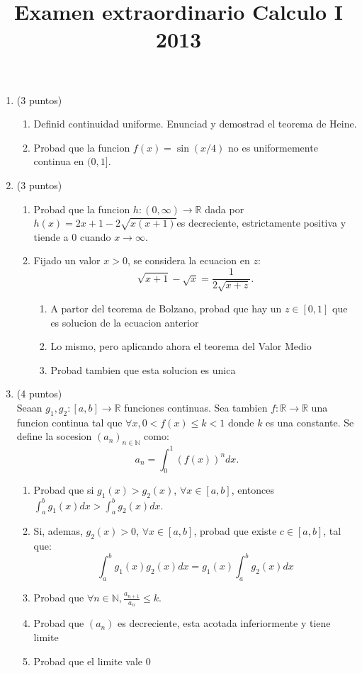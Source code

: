 \documentclass{article}
\begin{document}
\title{Examen extraordinario Calculo I 2013}
\date {}
\maketitle

\begin{enumerate}
\item (3 puntos)
\begin{enumerate}
\item Definid continuidad uniforme. Enunciad y demostrad el teorema de Heine.
\item Probad que la funcion $f(x) = \sin(x/4)$ no es uniformemente continua en $(0,1]$.
\end{enumerate}

\item (3 puntos)
\begin{enumerate}
\item Probad que la funcion $h : (0, \infty) \longrightarrow \mathbb{R}$ dada por 
$h(x) = 2x + 1 - 2\sqrt{x(x+1)}$es decreciente, estrictamente positiva y tiende a 0
cuando $x \to \infty$.
\item Fijado un valor $x > 0$, se considera la ecuacion en $z$:
\[
\sqrt{x+1} - \sqrt{x} = \frac{1}{2\sqrt{x+z}}.
\]
\begin{enumerate}
\item A partor del teorema de Bolzano, probad que hay un $z \in [0,1]$ que es solucion de la
ecuacion anterior
\item Lo mismo, pero aplicando ahora el teorema del Valor Medio
\item Probad tambien que esta solucion es unica
\end{enumerate}
\end{enumerate}
\item (4 puntos) \\
Seaan $g_1, g_2 : [a, b]  \longrightarrow \mathbb{R}$ funciones continuas. Sea tambien
$f : \mathbb{R} \longrightarrow \mathbb{R}$ una funcion continua tal que
$\forall x, 0 < f(x) \leq k < 1$ donde $k$ es una constante. Se define la socesion
$(a_n)_{n \in \mathbb{N}}$ como:
\[
a_n = \int_0^1 \left( f(x) \right)^n dx.
\]
\begin{enumerate}
\item Probad que si $g_1(x) > g_2(x)$, $\forall x \in [a, b]$, entonces
$\displaystyle \int_a^b g_1(x)dx > \int_a^b g_2(x)dx$.
\item Si, ademas, $g_2(x) > 0$, $\forall x \in [a, b]$, probad que existe $c \in [a,b]$, tal que:
\[
\int_a^b g_1(x)g_2(x)dx = g_1(x)\int_a^bg_2(x)dx
\]
\item Probad que $\displaystyle \forall n \in \mathbb{N}, \frac{a_{n+1}}{a_n} \leq k$.
\item Probad que $(a_n)$ es decreciente, esta acotada inferiormente y tiene limite
\item Probad que el limite vale 0
\end{enumerate}
\end{enumerate}
\end{document}
